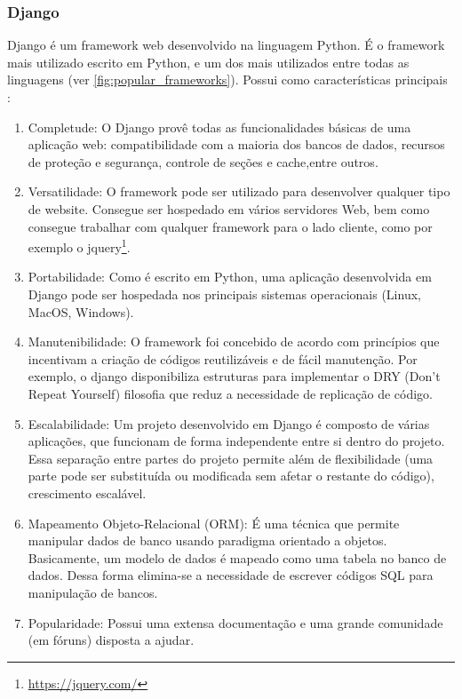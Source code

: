 	\subsubsection{Django}
		\label{sec:django}
		Django é um framework web desenvolvido na linguagem Python. É o framework mais utilizado escrito em Python, e um dos mais utilizados entre todas as linguagens (ver \autoref{fig:popular_frameworks}). Possui como características principais \cite{mozzila}: 
		\begin{enumerate}
			\item 
			Completude: O Django provê todas as funcionalidades básicas de uma aplicação web: compatibilidade com a maioria dos bancos de dados,
			recursos de proteção e segurança, controle de seções e cache,entre outros.
			\item 
			Versatilidade: O framework pode ser utilizado para desenvolver qualquer tipo de website. Consegue ser hospedado em vários servidores Web, bem como consegue trabalhar com qualquer framework para o lado cliente, como por exemplo o jquery\footnote{\url{https://jquery.com/}}.
			\item 
			Portabilidade: Como é escrito em Python, uma aplicação desenvolvida em Django pode ser hospedada nos principais sistemas operacionais (Linux, MacOS, Windows). 
			\item 
			Manutenibilidade: O framework foi concebido de acordo com princípios que incentivam a criação de códigos reutilizáveis e de fácil manutenção. Por exemplo, o django disponibiliza estruturas para implementar o DRY (Don't Repeat Yourself) filosofia que reduz a necessidade de replicação de código.
			\item 
			Escalabilidade: Um projeto desenvolvido em Django é composto de várias aplicações, que funcionam de forma independente entre si dentro do projeto. Essa separação entre partes do projeto permite além de flexibilidade (uma parte pode ser substituída ou modificada sem afetar o restante do código), crescimento escalável.
			\item
			Mapeamento Objeto-Relacional (ORM): É uma técnica que permite manipular dados de banco usando paradigma orientado a objetos. Basicamente, um modelo de dados é mapeado como uma tabela no banco de dados. Dessa forma elimina-se a necessidade de escrever códigos SQL para manipulação de bancos.
			\item 
			Popularidade: Possui uma extensa documentação e uma grande comunidade (em fóruns) disposta a ajudar.
		\end{enumerate}
	

